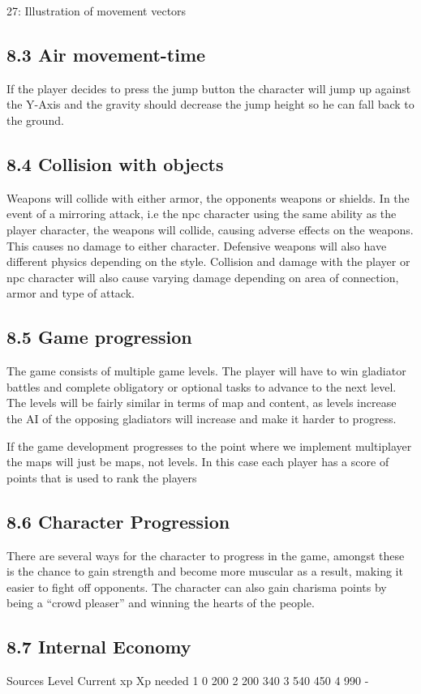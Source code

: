 \documentclass{article}
\begin{document}
\begin{titlepage}
{27: Illustration of movement vectors

\subsection{ 8.3 Air movement-time }
If the player decides to press the jump button the character will jump up against the Y-Axis and the gravity should decrease the jump height so he can fall back to the ground. 

\subsection{ 8.4 Collision with objects }
Weapons will collide with either armor, the opponents  weapons or shields. In the event of a mirroring attack, i.e the npc character using the same ability as the player character, the weapons will collide, causing adverse effects on the weapons. This causes no damage to either character. Defensive weapons will also have different physics depending on the style. Collision and damage with the player or npc character will also cause varying damage depending on area of connection, armor and type of attack.

\subsection{ 8.5 Game progression }
The game consists of multiple game levels. The player will have to win gladiator battles and complete obligatory or optional tasks to advance to the next level. The levels will be fairly similar in terms of map and content, as levels increase the AI of the opposing gladiators will increase and make it harder to progress.

If the game development progresses to the point where we implement multiplayer the maps will just be maps, not levels. In this case each player has a score of points that is used to rank the players

\subsection{ 8.6 Character Progression }
There are several ways for the character to progress in the game, amongst these is the chance to gain strength and become more muscular as a result, making it easier to fight off opponents. The character can also gain charisma points by being a “crowd pleaser” and winning the hearts of the people.

\subsection{ 8.7 Internal Economy }
Sources 
Level
Current xp
Xp needed
1
0
200
2
200
340
3
540
450
4
990
-

}
\end{titlepage}
\end{document}
